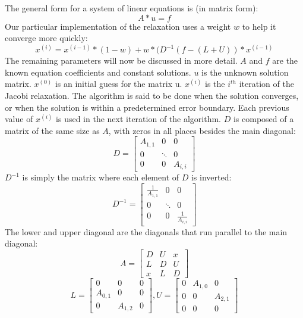 \documentclass[10pt]{article}
\begin{document}
\begin{multicols}{2}
  The general form for a system of linear equations is (in matrix form):
  \[A*u=f\]
  Our particular implementation of the relaxation uses a weight \(w\) to help it converge more quickly:
  \[x^{(i)} = x^{(i-1)} * (1-w)+w*(D^{-1}(f-(L+U))*x^{(i-1)}\]
  The remaining parameters will now be discussed in more detail.
  \(A\) and \(f\) are the known equation coefficients and constant solutions.
  \(u\) is the unknown solution matrix.
  \(x^{(0)}\) is an initial guess for the matrix u.
  \(x^{(i)}\) is the \(i^{th}\) iteration of the Jacobi relaxation.
  The algorithm is said to be done when the solution converges, or when the solution is within a predetermined error boundary.
  Each previous value of \(x^{(i)}\) is used in the next iteration of the algorithm.
  \(D\) is composed of a matrix of the same size as \(A\), with zeros in all places besides the main diagonal:
  \[
  D =
  \begin{bmatrix*}
    A_{1,1}     & 0         & 0 \\
    0           & \ddots    & 0 \\
    0           & 0         & A_{i,i}
  \end{bmatrix*}
  \]
  \(D^{-1}\) is simply the matrix where each element of \(D\) is inverted:
  \[
  D^{-1} =
  \begin{bmatrix*}
    \frac{1}{A_{1,1}}   & 0         & 0 \\
    0                   & \ddots    & 0 \\
    0                   & 0         & \frac{1}{A_{i,i}}
  \end{bmatrix*}
  \]
  The lower and upper diagonal are the diagonals that run parallel to the main diagonal:
  \[
  A=
  \begin{bmatrix*}
    D & U & x \\
    L & D & U \\
    x & L & D
  \end{bmatrix*}
  \]
  \[
  L=
  \begin{bmatrix*}
    0 & 0               & 0 \\
    A_{0,1} & 0         & 0 \\
    0       & A_{1,2}   & 0
  \end{bmatrix*}
  ,
  U=
  \begin{bmatrix*}
    0 & A_{1,0} & 0       \\
    0 & 0       & A_{2,1} \\
    0 & 0       & 0
  \end{bmatrix*}
  \]


\end{multicols}
\end{document}
